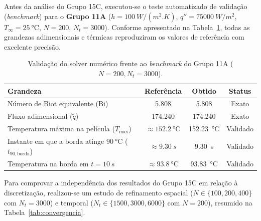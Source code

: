 \documentclass[11pt,a4paper]{article}
\begin{document}
Antes da análise do Grupo 15C, executou-se o teste automatizado de validação (\textit{benchmark}) para o \textbf{Grupo 11A} ($h = \SI{100}{W/(m^2.K)}$, $q'' = \SI{75000}{W/m^2}$, $T_\infty = \SI{25}{\celsius}$, $N = 200$, $N_t = 3000$). Conforme apresentado na Tabela~\ref{tab:benchmark}, todas as grandezas adimensionais e térmicas reproduziram os valores de referência com excelente precisão.

\begin{table}[H]
    \centering
    \caption{Validação do solver numérico frente ao \textit{benchmark} do Grupo 11A ($N = 200, N_t = 3000$).}
    \label{tab:benchmark}
    \begin{tabular}{lccc}
        \toprule
        \textbf{Grandeza} & \textbf{Referência} & \textbf{Obtido} & \textbf{Status} \\
        \midrule
        Número de Biot equivalente ($\text{Bi}$) & \num{5,808} & \num{5,808} & Exato \\
        Fluxo adimensional ($\tilde{q}$) & \num{174,240} & \num{174,240} & Exato \\
        Temperatura máxima na película ($T_{\max}$) & $\approx \SI{152,2}{\celsius}$ & \SI{152,23}{\celsius} & Validado \\
        Instante em que a borda atinge $\SI{90}{\celsius}$ ($t_{90,\text{borda}}$) & $\approx \SI{9,30}{s}$ & \SI{9,30}{s} & Validado \\
        Temperatura na borda em $t = \SI{10}{s}$ & $\approx \SI{93,8}{\celsius}$ & \SI{93,83}{\celsius} & Validado \\
        \bottomrule
    \end{tabular}
\end{table}

Para comprovar a independência dos resultados do Grupo 15C em relação à discretização, realizou-se um estudo de refinamento espacial ($N \in \{100, 200, 400\}$ com $N_t = 3000$) e temporal ($N_t \in \{1500, 3000, 6000\}$ com $N = 200$), resumido na Tabela~\ref{tab:convergencia}.
\end{document}
